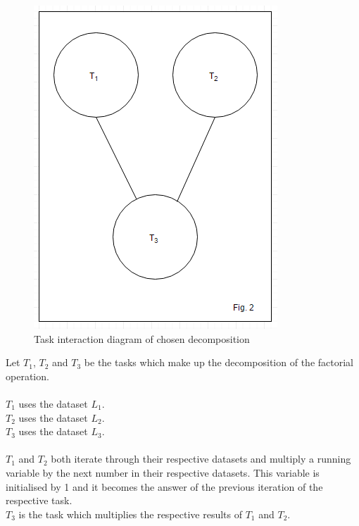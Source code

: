 \documentclass[11pt]{article}
\begin{document}
\begin{page}
\begin{figure}
\centering
     \includegraphics[scale=0.75]{parallel_fig2}\\
     Task interaction diagram of chosen decomposition
\end{figure}
\noindent Let $T_1$, $T_2$ and $T_3$ be the tasks which make up the decomposition of the factorial operation.\\
\\
\noindent $T_1$ uses the dataset $L_1$.\\
\noindent $T_2$ uses the dataset $L_2$.\\
\noindent $T_3$ uses the dataset $L_3$.\\
\\
\noindent $T_1$ and $T_2$ both iterate through their respective datasets and multiply a running variable by the next number in their respective datasets.
This variable is initialised by 1 and it becomes the answer of the previous iteration of the respective task. \\
\noindent $T_3$ is the task which multiplies the respective results of $T_1$ and $T_2$.\\\\



\end{page}
\end{document}
